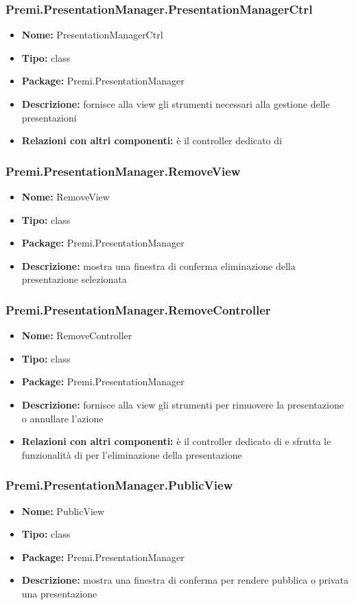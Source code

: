 \subsubsection{Premi.PresentationManager.PresentationManagerCtrl}
\begin{itemize}
  \item \textbf{Nome:} PresentationManagerCtrl
  \item \textbf{Tipo:} class
  \item \textbf{Package:} Premi.PresentationManager
  \item \textbf{Descrizione:} fornisce alla view gli strumenti necessari alla gestione delle presentazioni
  \item \textbf{Relazioni con altri componenti:} è il controller dedicato di   
\end{itemize}
\subsubsection{Premi.PresentationManager.RemoveView}
\begin{itemize}
  \item \textbf{Nome:} RemoveView
  \item \textbf{Tipo:} class
  \item \textbf{Package:} Premi.PresentationManager
  \item \textbf{Descrizione:} mostra una finestra di conferma eliminazione della presentazione selezionata
\end{itemize}
\subsubsection{Premi.PresentationManager.RemoveController}
\begin{itemize}
  \item \textbf{Nome:} RemoveController
  \item \textbf{Tipo:} class
  \item \textbf{Package:} Premi.PresentationManager
  \item \textbf{Descrizione:} fornisce alla view gli strumenti per rimuovere la presentazione o annullare l'azione
  \item \textbf{Relazioni con altri componenti:} è il controller dedicato di   e sfrutta le funzionalità di  per l'eliminazione della presentazione
\end{itemize}
\subsubsection{Premi.PresentationManager.PublicView}
\begin{itemize}
  \item \textbf{Nome:} PublicView
  \item \textbf{Tipo:} class
  \item \textbf{Package:} Premi.PresentationManager
  \item \textbf{Descrizione:} mostra una finestra di conferma per rendere pubblica o privata una presentazione
\end{itemize}
